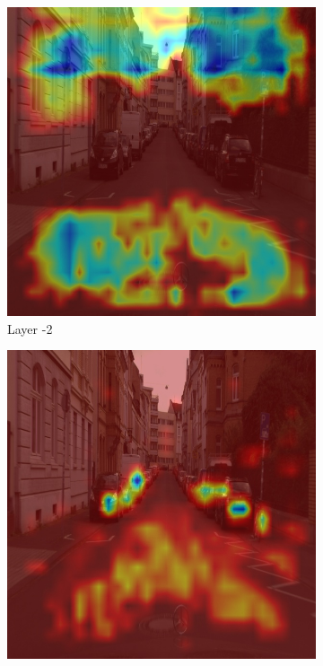 \begin{figure}
    \centering
    \begin{subfigure}[b]{0.49\textwidth}
        \centering
        \includegraphics[width=\textwidth]{figures/bonn_000037_000019_leftImg8bit.pnglayer-2/bonn_000037_000019_leftImg8bit.png_object(0)_heatmap}
        \caption{Layer -2}
        \label{fig:c-2}
    \end{subfigure}
    \hfill
    \begin{subfigure}[b]{0.49\textwidth}
        \centering
        \includegraphics[width=\textwidth]{figures/bonn_000037_000019_leftImg8bit.pnglayer-3/bonn_000037_000019_leftImg8bit.png_object(0)_heatmap}

\end{subfigure}
\end{figure}
